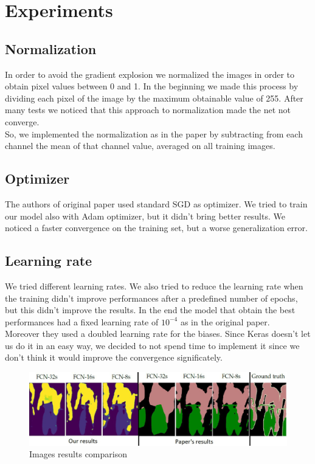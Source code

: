 \documentclass[10pt,twocolumn,letterpaper]{article}
\begin{document}
\section{Experiments}
\subsection{Normalization}
In order to avoid the gradient explosion we normalized the images in order to obtain pixel values between 0 and 1. In the beginning we made this process by dividing each pixel of the image by the maximum obtainable value of 255. After many tests we noticed that this approach to normalization made the net not converge. \\
So, we implemented the normalization as in the paper by subtracting from each channel the mean of that channel value, averaged on all training images.
\subsection{Optimizer}
The authors of original paper used standard SGD as optimizer. We tried to train our model also with Adam optimizer, but it didn't bring better results. We noticed a faster convergence on the training set, but a worse generalization error.
\subsection{Learning rate}
We tried different learning rates.
We also tried to reduce the learning rate when the training didn't improve performances after a predefined number of epochs, but this didn't improve the results.
In the end the model that obtain the best performances had a fixed learning rate of $ 10^{-4}$ as in the original paper. \\
Moreover they used a doubled learning rate for the biases. Since Keras doesn't let us do it in an easy way, we decided to not spend time to implement it since we don't think it would improve the convergence significately.
\begin{figure}
	\centering
	\includegraphics[width=\textwidth]{image/res}
	\caption{Images results comparison}
	\label{fig:results}
\end{figure}
\end{document}
